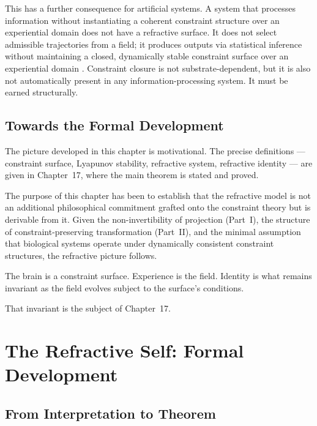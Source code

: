 \documentclass[11pt,openany]{book}
\begin{document}
This has a further consequence for artificial systems.  A
system that processes information without instantiating a
coherent constraint structure over an experiential domain
does not have a refractive surface.  It does not select
admissible trajectories from a field; it produces outputs
via statistical inference without maintaining a closed,
dynamically stable constraint surface over an experiential
domain \citep{thompson2023blindspot}.  Constraint closure
is not substrate-dependent, but it is also not
automatically present in any information-processing system.
It must be earned structurally.

\section{Towards the Formal Development}
\label{sec:towards-formal}

The picture developed in this chapter is motivational.  The
precise definitions --- constraint surface, Lyapunov
stability, refractive system, refractive identity --- are
given in Chapter~17, where the main theorem is stated and
proved.

The purpose of this chapter has been to establish that the
refractive model is not an additional philosophical
commitment grafted onto the constraint theory but is
derivable from it.  Given the non-invertibility of
projection (Part~I), the structure of
constraint-preserving transformation (Part~II), and the
minimal assumption that biological systems operate under
dynamically consistent constraint structures, the refractive
picture follows.

The brain is a constraint surface.  Experience is the
field.  Identity is what remains invariant as the field
evolves subject to the surface's conditions.

That invariant is the subject of Chapter~17.


\chapter{The Refractive Self: Formal Development}
\label{ch:refractive-self}

\section*{ From Interpretation to Theorem}
\end{document}
